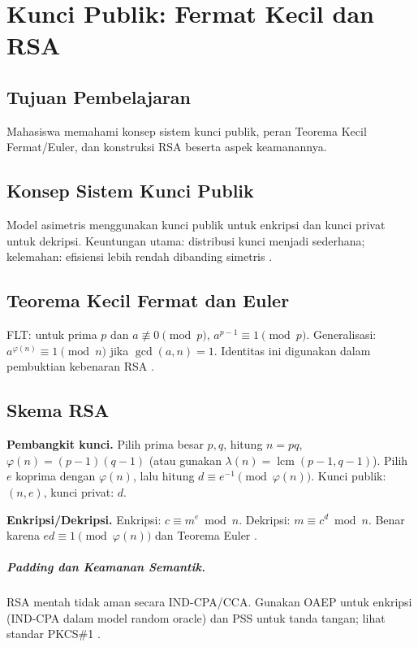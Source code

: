 \documentclass[../main.tex]{subfiles}
\begin{document}
\chapter{Kunci Publik: Fermat Kecil dan RSA}

\section{Tujuan Pembelajaran}
Mahasiswa memahami konsep sistem kunci publik, peran Teorema Kecil Fermat/Euler, dan konstruksi RSA beserta aspek keamanannya.

\section{Konsep Sistem Kunci Publik}
Model asimetris menggunakan kunci publik untuk enkripsi dan kunci privat untuk dekripsi. Keuntungan utama: distribusi kunci menjadi sederhana; kelemahan: efisiensi lebih rendah dibanding simetris \citep{katzlindell}.

\section{Teorema Kecil Fermat dan Euler}
FLT: untuk prima \(p\) dan \(a\not\equiv 0\pmod p\), \(a^{p-1}\equiv 1\pmod p\). Generalisasi: \(a^{\varphi(n)}\equiv 1\pmod n\) jika \(\gcd(a,n)=1\). Identitas ini digunakan dalam pembuktian kebenaran RSA \citep{hoffstein,rosen}.

\section{Skema RSA}
\textbf{Pembangkit kunci.} Pilih prima besar \(p,q\), hitung \(n=pq\), \(\varphi(n)=(p-1)(q-1)\) (atau gunakan \(\lambda(n)=\operatorname{lcm}(p-1,q-1)\)). Pilih \(e\) koprima dengan \(\varphi(n)\), lalu hitung \(d\equiv e^{-1}\pmod{\varphi(n)}\). Kunci publik: \((n,e)\), kunci privat: \(d\).

\textbf{Enkripsi/Dekripsi.} Enkripsi: \(c\equiv m^e\bmod n\). Dekripsi: \(m\equiv c^d\bmod n\). Benar karena \(ed\equiv 1\pmod{\varphi(n)}\) dan Teorema Euler \citep{rsa}.

\paragraph{Padding dan Keamanan Semantik.} RSA mentah tidak aman secara IND-CPA/CCA. Gunakan OAEP untuk enkripsi (IND-CPA dalam model random oracle) dan PSS untuk tanda tangan; lihat standar PKCS\#1 \citep{rfc8017}.
\end{document}
